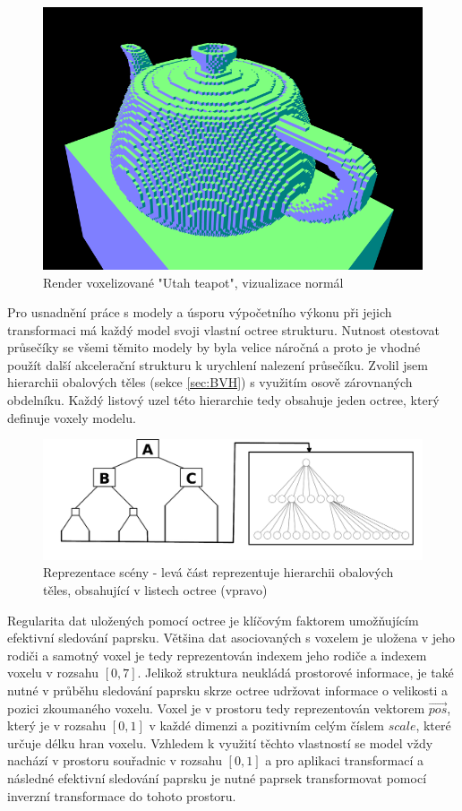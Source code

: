 \begin{figure}[H]
	\centering
	\includegraphics[scale=1]{obrazky-figures/normals_teapot.png}
	\caption{Render voxelizované "Utah teapot", vizualizace normál }
	\label{fig:octree_child}
\end{figure}

Pro usnadnění práce s modely a úsporu výpočetního výkonu při jejich transformaci má každý model svoji vlastní octree strukturu. Nutnost otestovat průsečíky se všemi těmito modely by byla velice náročná a proto je vhodné použít další akcelerační strukturu k urychlení nalezení průsečíku. Zvolil jsem hierarchii obalových těles (sekce \ref{sec:BVH}) s využitím osově zárovnaných obdelníku. Každý listový uzel této hierarchie tedy obsahuje jeden octree, který definuje voxely modelu. 

\begin{figure}[H]
	\centering
	\includegraphics[scale=1]{images/bvh_octree.png}
	\caption{Reprezentace scény - levá část reprezentuje hierarchii obalových těles, obsahující v listech octree (vpravo)}
	\label{fig:scene_bvh_repr}
\end{figure}

Regularita dat uložených pomocí octree je klíčovým faktorem umožňujícím efektivní sledování paprsku. Většina dat asociovaných s voxelem je uložena v jeho rodiči a samotný voxel je tedy reprezentován indexem jeho rodiče a indexem voxelu v rozsahu $[0, 7]$. Jelikož struktura neukládá prostorové informace, je také nutné v průběhu sledování paprsku skrze octree udržovat informace o velikosti a pozici zkoumaného voxelu. Voxel je v prostoru tedy reprezentován vektorem $\vec{pos}$, který je v rozsahu $[0, 1]$ v každé dimenzi a pozitivním celým číslem $scale$, které určuje délku hran voxelu. Vzhledem k využití těchto vlastností se model vždy nachází v prostoru souřadnic v rozsahu $[0, 1]$ a pro aplikaci transformací a následné efektivní sledování paprsku je nutné paprsek transformovat pomocí inverzní transformace do tohoto prostoru.

